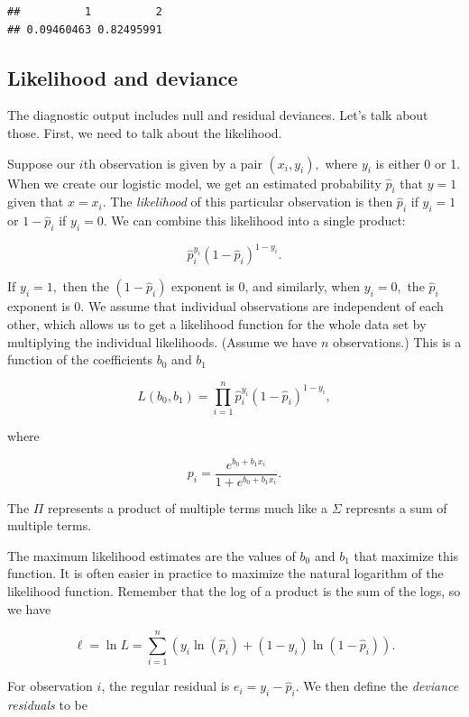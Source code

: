\documentclass[
]{book}
\theoremstyle{definition}
\theoremstyle{definition}
\theoremstyle{definition}
\theoremstyle{definition}
\theoremstyle{remark}
\begin{document}
\begin{verbatim}
##          1          2 
## 0.09460463 0.82495991
\end{verbatim}

\subsection*{Likelihood and deviance}\label{likelihood-and-deviance}

The diagnostic output includes null and residual deviances. Let's talk about those. First, we need to talk about the likelihood.

Suppose our \(i\)th observation is given by a pair \((x_i,y_i),\) where \(y_i\) is either 0 or 1. When we create our logistic model, we get an estimated probability \(\hat{p}_i\) that \(y=1\) given that \(x=x_i\). The \emph{likelihood} of this particular observation is then \(\hat{p}_i\) if \(y_i=1\) or \(1-\hat{p}_i\) if \(y_i=0.\) We can combine this likelihood into a single product:

\[\hat{p}_i^{y_i}(1-\hat{p}_i)^{1-y_i}.\]

If \(y_i=1,\) then the \((1-\hat{p}_i)\) exponent is 0, and similarly, when \(y_i=0,\) the \(\hat{p}_i\) exponent is 0. We assume that individual observations are independent of each other, which allows us to get a likelihood function for the whole data set by multiplying the individual likelihoods. (Assume we have \(n\) observations.) This is a function of the coefficients \(b_0\) and \(b_1\)

\[L(b_0,b_1)=\prod_{i=1}^n \hat{p}_i^{y_i}(1-\hat{p}_i)^{1-y_i},\]

where

\[p_i=\frac{e^{b_0+b_1x_i}}{1+e^{b_0+b_1x_i}}.\]

The \(\Pi\) represents a product of multiple terms much like a \(\Sigma\) represnts a sum of multiple terms.

The maximum likelihood estimates are the values of \(b_0\) and \(b_1\) that maximize this function. It is often easier in practice to maximize the natural logarithm of the likelihood function. Remember that the log of a product is the sum of the logs, so we have

\[\ell=\ln L=\sum_{i=1}^n\left( y_i\ln(\hat{p}_i)+(1-y_i)\ln(1-\hat{p}_i)\right).\]

For observation \(i\), the regular residual is \(e_i=y_i-\hat{p}_i.\) We then define the \emph{deviance residuals} to be
\end{document}
